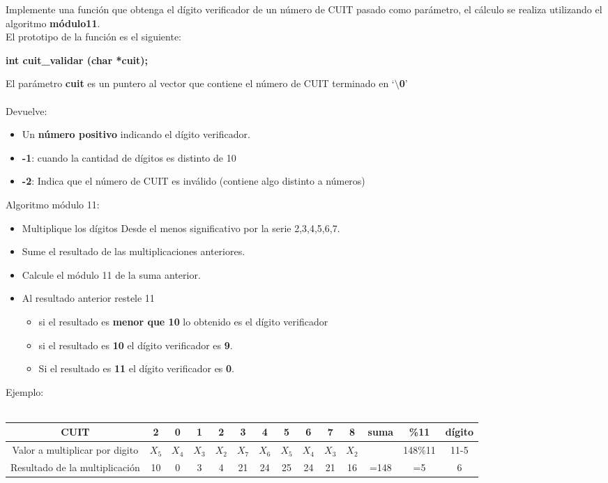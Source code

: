 \documentclass[12pt]{article} %
\begin{document}
Implemente una función que obtenga el dígito verificador de un número de CUIT pasado como 
parámetro, el cálculo se realiza utilizando el algoritmo {\bf módulo11}.\\
 El prototipo de la función es el siguiente:
\begin{center}
{\bf int cuit\_validar (char *cuit);}
\end{center}
El parámetro {\bf cuit} es un puntero al vector que contiene el número de CUIT terminado en ‘{\bf $\setminus$0}’\\
\\
Devuelve:
\begin{itemize}
\item Un {\bf número positivo} indicando el dígito verificador. 
\item {\bf -1}: cuando la cantidad de dígitos es distinto de 10 
\item {\bf -2}: Indica que el número de CUIT es inválido (contiene algo distinto a números) \end{itemize}
Algoritmo módulo 11:  
\begin{itemize}
\item Multiplique los dígitos Desde el menos significativo por la serie 2,3,4,5,6,7.
\item Sume el resultado de las multiplicaciones anteriores.
\item Calcule el módulo 11 de la suma anterior.
\item Al resultado anterior restele 11
\begin{itemize}
\item si el resultado es {\bf menor que 10} lo obtenido es el dígito verificador
\item si el resultado es {\bf 10} el dígito verificador es {\bf 9}.
\item Si el resultado es {\bf 11} el dígito verificador es {\bf 0}.
\end{itemize} 
\end{itemize}
Ejemplo:\\
\\
\noindent
\fontsize{10pt}{10pt}\selectfont
   \begin{tabular}{| c | c | c | c | c | c | c | c | c | c | c | c | c | c |}
    \hline
     CUIT & 2 & 0 & 1 & 2 & 3 & 4 & 5 & 6 & 7 & 8 & suma & \%11 & dígito\\ \hline 
     Valor a multiplicar por digito & $X_5$ & $X_4$ & $X_3$ & $X_2$ & $X_7$ & $X_6$ & $X_5$ & $X_4$ & $X_3$ & $X_2$ &  &148\%11 & 11-5 \\ \hline 
     Resultado de la multiplicación & 10 & 0 & 3 & 4 & 21 & 24 & 25 & 24 & 21 & 16 & =148 & =5 & 6\\ \hline 
   \end{tabular}	
\fontsize{12pt}{12pt}\selectfont
 
\end{document}
